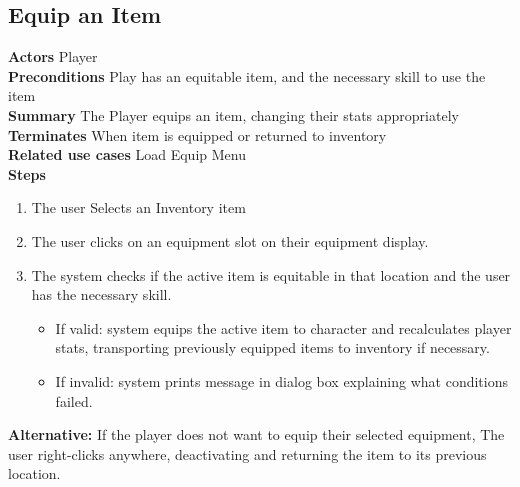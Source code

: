 \documentclass{report}
\begin{document}
\subsection{Equip an Item}
\textbf{Actors} Player \\
\textbf{Preconditions} Play has an equitable item, and the necessary skill to use the item \\
\textbf{Summary} The Player equips an item, changing their stats appropriately \\
\textbf{Terminates} When item is equipped or returned to inventory \\
\textbf{Related use cases} Load Equip Menu \\
\textbf{Steps}

\begin{enumerate}
	\item The user Selects an Inventory item
	\item The user clicks on an equipment slot on their equipment display.
	\item The system checks if the active item is equitable in that location and the user has the necessary skill.
	\begin{itemize}
		\item If valid: system equips the active item to character and recalculates player stats,
		transporting previously equipped items to inventory if necessary.
		\item If invalid: system prints message in dialog box explaining what conditions failed.
	\end{itemize}
\end{enumerate}
\textbf{Alternative:} If the player does not want to equip their selected equipment, The user right-clicks anywhere, deactivating and returning the item to its previous location. \\
\end{document}
